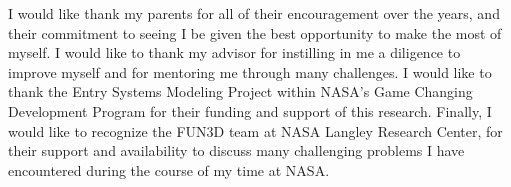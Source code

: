 \begin{acknowledgements}
I would like thank my parents for all of their encouragement over the years, and
their commitment to seeing I be given the best opportunity to make the most of
myself.  I would like to thank my advisor for instilling in me a diligence to
improve myself and for mentoring me through many challenges.  I would like to
thank the Entry Systems Modeling Project within NASA's Game Changing Development
Program for their funding and support of this research.  Finally, I would
like to recognize the FUN3D team at NASA Langley Research Center, for their
support and availability to discuss many challenging problems I have encountered
during the course of my time at NASA.
\end{acknowledgements}


\thesistableofcontents

\thesislistoftables

\thesislistoffigures
